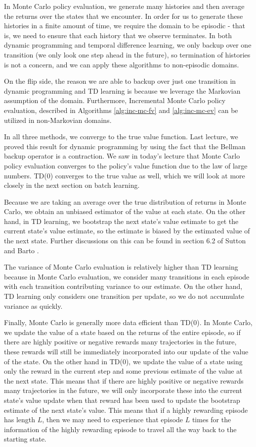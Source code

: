 \documentclass{article}
\begin{document}
In Monte Carlo policy evaluation, we generate many histories and then average the returns over the states that we encounter.  In order for us to generate these histories in a finite amount of time, we require the domain to be episodic - that is, we need to ensure that each history that we observe terminates.  In both dynamic programming and temporal difference learning, we only backup over one transition (we only look one step ahead in the future), so termination of histories is not a concern, and we can apply these algorithms to non-episodic domains.

On the flip side, the reason we are able to backup over just one transition in dynamic programming and TD learning is because we leverage the Markovian assumption of the domain.  Furthermore, Incremental Monte Carlo policy evaluation, described in Algorithms \ref{alg:inc-mc-fv} and \ref{alg:inc-mc-ev} can be utilized in non-Markovian domains.

In all three methods, we converge to the true value function.  Last lecture, we proved this result for dynamic programming by using the fact that the Bellman backup operator is a contraction.  We saw in today's lecture that Monte Carlo policy evaluation converges to the policy's value function due to the law of large numbers.  TD(0) converges to the true value as well, which we will look at more closely in the next section on batch learning.

Because we are taking an average over the true distribution of returns in Monte Carlo, we obtain an unbiased estimator of the value at each state.  On the other hand, in TD learning, we bootstrap the next state's value estimate to get the current state's value estimate, so the estimate is biased by the estimated value of the next state.  Further discussions on this can be found in section 6.2 of Sutton and Barto \cite{sb18}.

The variance of Monte Carlo evaluation is relatively higher than TD learning because in Monte Carlo evaluation, we consider many transitions in each episode with each transition contributing variance to our estimate.  On the other hand, TD learning only considers one transition per update, so we do not accumulate variance as quickly.

Finally, Monte Carlo is generally more data efficient than TD(0).  In Monte Carlo, we update the value of a state based on the returns of the entire episode, so if there are highly positive or negative rewards many trajectories in the future, these rewards will still be immediately incorporated into our update of the value of the state. On the other hand in TD(0), we update the value of a state using only the reward in the current step and some previous estimate of the value at the next state.  This means that if there are highly positive or negative rewards many trajectories in the future, we will only incorporate these into the current state's value update when that reward has been used to update the bootstrap estimate of the next state's value.  This means that if a highly rewarding episode has length $L$, then we may need to experience that episode $L$ times for the information of the highly rewarding episode to travel all the way back to the starting state.
\end{document}
